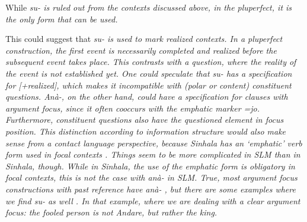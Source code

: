 While \em su- \em is ruled out from the contexts discussed above, in the pluperfect, it is the only form that can be used.



This could suggest that \em su- \em is used to mark realized contexts. In a pluperfect construction, the first event is necessarily completed and realized before the subsequent event takes place. This contrasts with a question, where the reality of the event is not established yet. One could speculate that \em su- \em has a specification for [+realized], which makes it incompatible with (polar or content) constituent questions. \em Anà-, \em on the other hand, could have a specification for clauses with argument focus, since it often cooccurs with the emphatic marker \em =jo\em. Furthermore, constituent questions also have the questioned element in focus position. This distinction   according to information structure would also make sense from a contact language perspective, because Sinhala has an `emphatic' verb form used in focal contexts \citep{Gair1985calque}. Things seem to be more complicated in SLM than in Sinhala, though. While in Sinhala, the use of the emphatic form is obligatory in focal contexts, this is not the case with \em anà- \em in SLM. True, most argument focus constructions with past reference have \em anà- \em {} , but there are some examples where we find \em su- \em as well . In that example, where we are dealing with a clear argument focus: the fooled person is not Andare, but rather the king.

 

  

